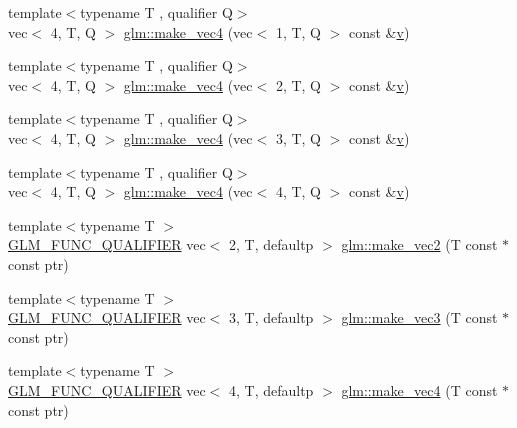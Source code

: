 \begin{DoxyCompactItemize}
{\footnotesize template$<$typename T , qualifier Q$>$ }\\vec$<$ 4, T, Q $>$ \mbox{\hyperlink{group__gtc__type__ptr_ga600cb97f70c5d50d3a4a145e1cafbf37}{glm\+::make\+\_\+vec4}} (vec$<$ 1, T, Q $>$ const \&\mbox{\hyperlink{_s_d_l__opengl_8h_a10a82eabcb59d2fcd74acee063775f90}{v}})
\item 
{\footnotesize template$<$typename T , qualifier Q$>$ }\\vec$<$ 4, T, Q $>$ \mbox{\hyperlink{group__gtc__type__ptr_gaa9bd116caf28196fd1cf00b278286fa7}{glm\+::make\+\_\+vec4}} (vec$<$ 2, T, Q $>$ const \&\mbox{\hyperlink{_s_d_l__opengl_8h_a10a82eabcb59d2fcd74acee063775f90}{v}})
\item 
{\footnotesize template$<$typename T , qualifier Q$>$ }\\vec$<$ 4, T, Q $>$ \mbox{\hyperlink{group__gtc__type__ptr_ga4036328ba4702c74cbdfad1fc03d1b8f}{glm\+::make\+\_\+vec4}} (vec$<$ 3, T, Q $>$ const \&\mbox{\hyperlink{_s_d_l__opengl_8h_a10a82eabcb59d2fcd74acee063775f90}{v}})
\item 
{\footnotesize template$<$typename T , qualifier Q$>$ }\\vec$<$ 4, T, Q $>$ \mbox{\hyperlink{group__gtc__type__ptr_gaa95cb15732f708f613e65a0578895ae5}{glm\+::make\+\_\+vec4}} (vec$<$ 4, T, Q $>$ const \&\mbox{\hyperlink{_s_d_l__opengl_8h_a10a82eabcb59d2fcd74acee063775f90}{v}})
\item 
{\footnotesize template$<$typename T $>$ }\\\mbox{\hyperlink{setup_8hpp_a33fdea6f91c5f834105f7415e2a64407}{G\+L\+M\+\_\+\+F\+U\+N\+C\+\_\+\+Q\+U\+A\+L\+I\+F\+I\+ER}} vec$<$ 2, T, defaultp $>$ \mbox{\hyperlink{group__gtc__type__ptr_ga81253cf7b0ebfbb1e70540c5774e6824}{glm\+::make\+\_\+vec2}} (T const $\ast$const ptr)
\item 
{\footnotesize template$<$typename T $>$ }\\\mbox{\hyperlink{setup_8hpp_a33fdea6f91c5f834105f7415e2a64407}{G\+L\+M\+\_\+\+F\+U\+N\+C\+\_\+\+Q\+U\+A\+L\+I\+F\+I\+ER}} vec$<$ 3, T, defaultp $>$ \mbox{\hyperlink{group__gtc__type__ptr_gad9e0d36ff489cb30c65ad1fa40351651}{glm\+::make\+\_\+vec3}} (T const $\ast$const ptr)
\item 
{\footnotesize template$<$typename T $>$ }\\\mbox{\hyperlink{setup_8hpp_a33fdea6f91c5f834105f7415e2a64407}{G\+L\+M\+\_\+\+F\+U\+N\+C\+\_\+\+Q\+U\+A\+L\+I\+F\+I\+ER}} vec$<$ 4, T, defaultp $>$ \mbox{\hyperlink{group__gtc__type__ptr_ga63f576518993efc22a969f18f80e29bb}{glm\+::make\+\_\+vec4}} (T const $\ast$const ptr)

\end{DoxyCompactItemize}
